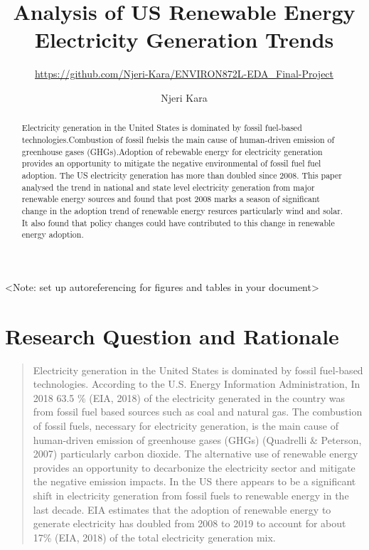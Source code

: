 \documentclass[12pt,]{article}
\title{Analysis of US Renewable Energy Electricity Generation Trends}
\subtitle{\url{https://github.com/Njeri-Kara/ENVIRON872L-EDA_Final-Project}}
\author{Njeri Kara}
\date{}
\begin{document}
\maketitle
\begin{abstract}
Electricity generation in the United States is dominated by fossil
fuel-based technologies.Combustion of fossil fuelsis the main cause of
human-driven emission of greenhouse gases (GHGs).Adoption of rebewable
energy for electricity generation provides an opportunity to mitigate
the negative environmental of fossil fuel fuel adoption. The US
electricity generation has more than doubled since 2008. This paper
analysed the trend in national and state level electricity generation
from major renewable energy sources and found that post 2008 marks a
season of significant change in the adoption trend of renewable energy
resurces particularly wind and solar. It also found that policy changes
could have contributed to this change in renewable energy adoption.
\end{abstract}

\newpage

\tableofcontents  \newpage
\listoftables  \newpage
\listoffigures  \newpage

\textless{}Note: set up autoreferencing for figures and tables in your
document\textgreater{}

\section{Research Question and
Rationale}\label{research-question-and-rationale}

\begin{quote}
Electricity generation in the United States is dominated by fossil
fuel-based technologies. According to the U.S. Energy Information
Administration, In 2018 63.5 \% (EIA, 2018) of the electricity generated
in the country was from fossil fuel based sources such as coal and
natural gas. The combustion of fossil fuels, necessary for electricity
generation, is the main cause of human-driven emission of greenhouse
gases (GHGs) (Quadrelli \& Peterson, 2007) particularly carbon dioxide.
The alternative use of renewable energy provides an opportunity to
decarbonize the electricity sector and mitigate the negative emission
impacts. In the US there appears to be a significant shift in
electricity generation from fossil fuels to renewable energy in the last
decade. EIA estimates that the adoption of renewable energy to generate
electricity has doubled from 2008 to 2019 to account for about 17\%
(EIA, 2018) of the total electricity generation mix.
\end{quote}
\end{document}
